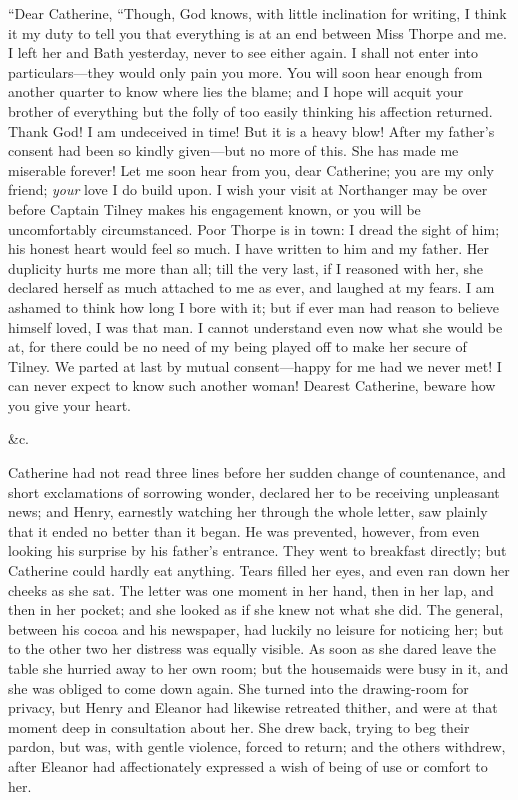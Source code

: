 “Dear Catherine,\crlf
“Though, God knows, with little inclination for writing, I think it my duty to tell you that everything is at an end between Miss Thorpe and me. I left her and Bath yesterday, never to see either again. I shall not enter into particulars---they would only pain you more. You will soon hear enough from another quarter to know where lies the blame; and I hope will acquit your brother of everything but the folly of too easily thinking his affection returned. Thank God! I am undeceived in time! But it is a heavy blow! After my father's consent had been so kindly given---but no more of this. She has made me miserable forever! Let me soon hear from you, dear Catherine; you are my only friend; {\em your} love I do build upon. I wish your visit at Northanger may be over before Captain Tilney makes his engagement known, or you will be uncomfortably circumstanced. Poor Thorpe is in town: I dread the sight of him; his honest heart would feel so much. I have written to him and my father. Her duplicity hurts me more than all; till the very last, if I reasoned with her, she declared herself as much attached to me as ever, and laughed at my fears. I am ashamed to think how long I bore with it; but if ever man had reason to believe himself loved, I was that man. I cannot understand even now what she would be at, for there could be no need of my being played off to make her secure of Tilney. We parted at last by mutual consent---happy for me had we never met! I can never expect to know such another woman! Dearest Catherine, beware how you give your heart.

 &c.

Catherine had not read three lines before her sudden change of countenance, and short exclamations of sorrowing wonder, declared her to be receiving unpleasant news; and Henry, earnestly watching her through the whole letter, saw plainly that it ended no better than it began. He was prevented, however, from even looking his surprise by his father's entrance. They went to breakfast directly; but Catherine could hardly eat anything. Tears filled her eyes, and even ran down her cheeks as she sat. The letter was one moment in her hand, then in her lap, and then in her pocket; and she looked as if she knew not what she did. The general, between his cocoa and his newspaper, had luckily no leisure for noticing her; but to the other two her distress was equally visible. As soon as she dared leave the table she hurried away to her own room; but the housemaids were busy in it, and she was obliged to come down again. She turned into the drawing-room for privacy, but Henry and Eleanor had likewise retreated thither, and were at that moment deep in consultation about her. She drew back, trying to beg their pardon, but was, with gentle violence, forced to return; and the others withdrew, after Eleanor had affectionately expressed a wish of being of use or comfort to her.


